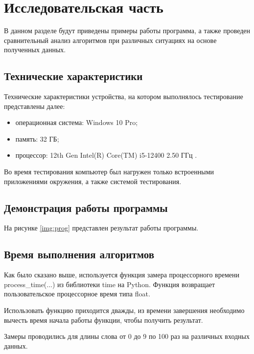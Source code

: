 \chapter{Исследовательская часть}

В данном разделе будут приведены примеры работы программа, а также проведен сравнительный анализ алгоритмов при различных ситуациях на основе полученных данных.

\section{Технические характеристики}

Технические характеристики устройства, на котором выполнялось тестирование представлены далее:

\begin{itemize}
	\item операционная система: Windows 10 Pro;
	\item память: 32 ГБ;
	\item процессор: 12th Gen Intel(R) Core(TM) i5-12400   2.50 ГГц \cite{intel}.
\end{itemize}

Во время тестирования компьютер был нагружен только встроенными приложениями окружения, а также системой тестирования.

\section{Демонстрация работы программы}

На рисунке \ref{img:prog} представлен результат работы программы.

\clearpage

\section{Время выполнения алгоритмов}

Как было сказано выше, используется функция замера процессорного времени process\_time(...) из библиотеки time на Python. Функция возвращает пользовательское процессорное время типа float.

Использовать функцию приходится дважды, из времени завершения необходимо вычесть время начала работы функции, чтобы получить результат.

Замеры проводились для длины слова от 0 до 9 по 100 раз на различных входных данных.


